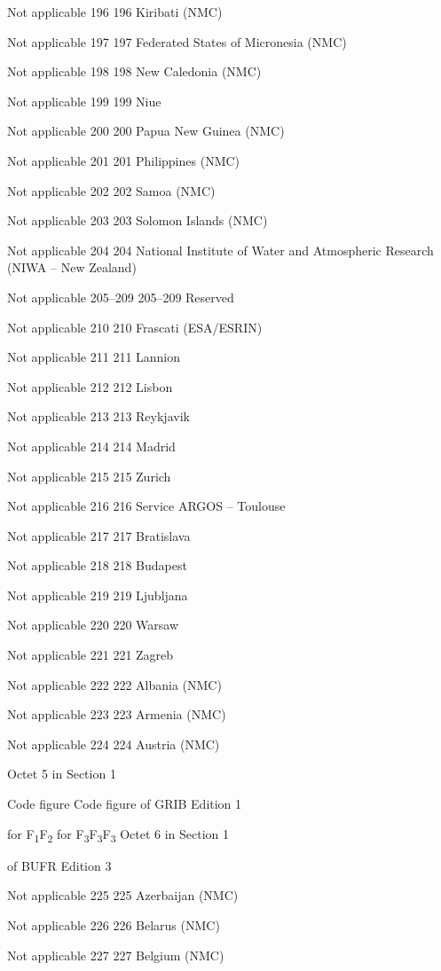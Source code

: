 Not applicable 196 196 Kiribati (NMC)

Not applicable 197 197 Federated States of Micronesia (NMC)

Not applicable 198 198 New Caledonia (NMC)

Not applicable 199 199 Niue

Not applicable 200 200 Papua New Guinea (NMC)

Not applicable 201 201 Philippines (NMC)

Not applicable 202 202 Samoa (NMC)

Not applicable 203 203 Solomon Islands (NMC)

Not applicable 204 204 National Institute of Water and Atmospheric Research (NIWA -- New Zealand)

Not applicable 205--209 205--209 Reserved

Not applicable 210 210 Frascati (ESA/ESRIN)

Not applicable 211 211 Lannion

Not applicable 212 212 Lisbon

Not applicable 213 213 Reykjavik

Not applicable 214 214 Madrid

Not applicable 215 215 Zurich

Not applicable 216 216 Service ARGOS -- Toulouse

Not applicable 217 217 Bratislava

Not applicable 218 218 Budapest

Not applicable 219 219 Ljubljana

Not applicable 220 220 Warsaw

Not applicable 221 221 Zagreb

Not applicable 222 222 Albania (NMC)

Not applicable 223 223 Armenia (NMC)

Not applicable 224 224 Austria (NMC)

Octet 5 in Section 1

Code figure Code figure of GRIB Edition 1

for F\textsubscript{1}F\textsubscript{2} for F\textsubscript{3}F\textsubscript{3}F\textsubscript{3} Octet 6 in Section 1

of BUFR Edition 3

Not applicable 225 225 Azerbaijan (NMC)

Not applicable 226 226 Belarus (NMC)

Not applicable 227 227 Belgium (NMC)

